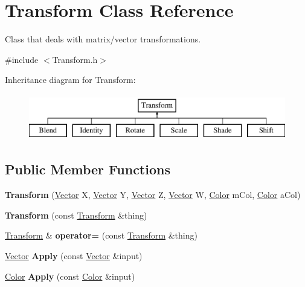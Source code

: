 \hypertarget{class_transform}{}\section{Transform Class Reference}
\label{class_transform}


Class that deals with matrix/vector transformations.  




{\ttfamily \#include $<$Transform.\+h$>$}

Inheritance diagram for Transform\+:\begin{figure}[H]
\begin{center}
\leavevmode
\includegraphics[height=2.000000cm]{class_transform}
\end{center}
\end{figure}
\subsection*{Public Member Functions}
\begin{DoxyCompactItemize}
\item 
\hypertarget{class_transform_ab826e0b6b6a46589e2a8ed4114eae17e}{}\label{class_transform_ab826e0b6b6a46589e2a8ed4114eae17e} 
{\bfseries Transform} (\hyperlink{class_vector}{Vector} X, \hyperlink{class_vector}{Vector} Y, \hyperlink{class_vector}{Vector} Z, \hyperlink{class_vector}{Vector} W, \hyperlink{class_color}{Color} m\+Col, \hyperlink{class_color}{Color} a\+Col)
\item 
\hypertarget{class_transform_a8572d47a093861b3372fe8ee3bddcc10}{}\label{class_transform_a8572d47a093861b3372fe8ee3bddcc10} 
{\bfseries Transform} (const \hyperlink{class_transform}{Transform} \&thing)
\item 
\hypertarget{class_transform_a542213b758a490a2203ea7fd0266776a}{}\label{class_transform_a542213b758a490a2203ea7fd0266776a} 
\hyperlink{class_transform}{Transform} \& {\bfseries operator=} (const \hyperlink{class_transform}{Transform} \&thing)
\item 
\hypertarget{class_transform_ad93311f2830ef5ca081a7d73579d4015}{}\label{class_transform_ad93311f2830ef5ca081a7d73579d4015} 
\hyperlink{class_vector}{Vector} {\bfseries Apply} (const \hyperlink{class_vector}{Vector} \&input)
\item 
\hypertarget{class_transform_a697d100cd8b73be18d5d3af398a0500e}{}\label{class_transform_a697d100cd8b73be18d5d3af398a0500e} 
\hyperlink{class_color}{Color} {\bfseries Apply} (const \hyperlink{class_color}{Color} \&input)
\end{DoxyCompactItemize}
